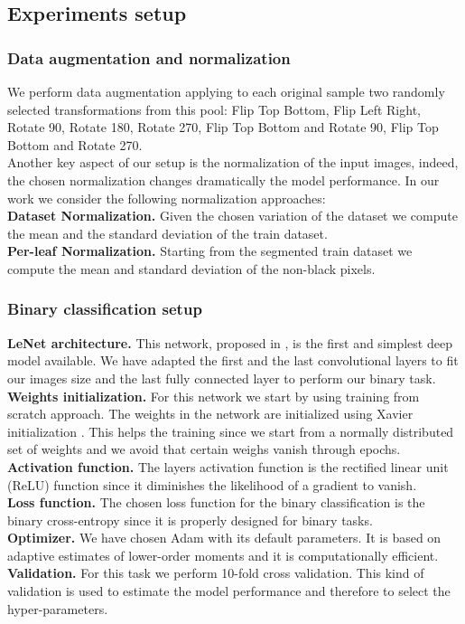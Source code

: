 \subsection{Experiments setup}
\subsubsection{Data augmentation and normalization}
We perform data augmentation applying to each original sample two randomly selected transformations from this pool: Flip Top Bottom, Flip Left Right, Rotate 90\degree, Rotate 180\degree, Rotate 270\degree, Flip Top Bottom and Rotate 90\degree, Flip Top Bottom and Rotate 270\degree.
\\
Another key aspect of our setup is the normalization of the input images, indeed, the chosen normalization changes dramatically the model performance. In our work we consider the following normalization approaches:
\\
\textbf{Dataset Normalization.} Given the chosen variation of the dataset we compute the mean and the standard deviation of the train dataset.
\\
\textbf{Per-leaf Normalization.} Starting from the segmented train dataset we compute the mean and standard deviation of the non-black pixels. \vspace{-10pt}
\subsubsection{Binary classification setup}
\textbf{LeNet architecture.} This network, proposed in \cite{ref30}, is the first and simplest deep model available. We have adapted the first and the last convolutional layers to fit our images size and the last fully connected layer to perform our binary task.
\\
\textbf{Weights initialization.} For this network we start by using training from scratch approach. The weights in the network are initialized using Xavier initialization \cite{ref31}. This helps the training since we start from a normally distributed set of weights and we avoid that certain weighs vanish through epochs.
\\
\textbf{Activation function.}
The layers activation function is the rectified linear unit (ReLU) function since it diminishes the likelihood of a gradient to vanish.
\\
\textbf{Loss function.}
The chosen loss function for the binary classification is the binary cross-entropy since it is properly designed for binary tasks.
\\
\textbf{Optimizer.}
We have chosen Adam with its default parameters. It is based on adaptive estimates of lower-order moments and it is computationally efficient.
\\
\textbf{Validation.}
For this task we perform 10-fold cross validation. This kind of validation is used to estimate the model performance and therefore to select the hyper-parameters.
